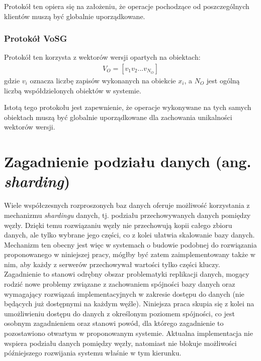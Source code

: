 Protokół ten opiera się na założeniu, że operacje pochodzące od poszczególnych klientów muszą być globalnie uporządkowane.

\subsubsection{Protokół VoSG}

Protokół ten korzysta z wektorów wersji opartych na obiektach:
\begin{align*}
    V_O = [v_1 v_2 ... v_{N_O}]
\end{align*}
gdzie $ v_i $ oznacza liczbę zapisów wykonanych na obiekcie $ x_i $, a $ N_O $ jest ogólną liczbą współdzielonych obiektów w systemie.

Istotą tego protokołu jest zapewnienie, że operacje wykonywane na tych samych obiektach muszą być globalnie uporządkowane dla zachowania unikalności wektorów wersji.

\section{Zagadnienie podziału danych (ang. \textit{sharding})}

Wiele współczesnych rozproszonych baz danych oferuje możliwość korzystania z mechanizmu \textit{shardingu} danych, tj. podziału przechowywanych danych pomiędzy węzły. Dzięki temu rozwiązaniu węzły nie przechowują kopii całego zbioru danych, ale tylko wybrane jego części, co z kolei ułatwia skalowanie bazy danych. Mechanizm ten obecny jest więc w systemach o budowie podobnej do rozwiązania proponowanego w niniejszej pracy, mógłby być zatem zaimplementowany także w nim, aby każdy z serwerów przechowywał wartości tylko części kluczy. Zagadnienie to stanowi odrębny obszar problematyki replikacji danych, mogący rodzić nowe problemy związane z zachowaniem spójności bazy danych oraz wymagający rozwiązań implementacyjnych w zakresie dostępu do danych (nie będących już dostępnymi na każdym węźle). Niniejsza praca skupia się z kolei na umożliwieniu dostępu do danych z określonym poziomem spójności, co jest osobnym zagadnieniem oraz stanowi powód, dla którego zagadnienie to pozostawiono otwartym w proponowanym systemie. Aktualna implementacja nie wspiera podziału danych pomiędzy węzły, natomiast nie blokuje możliwości późniejszego rozwijania systemu właśnie w tym kierunku.
